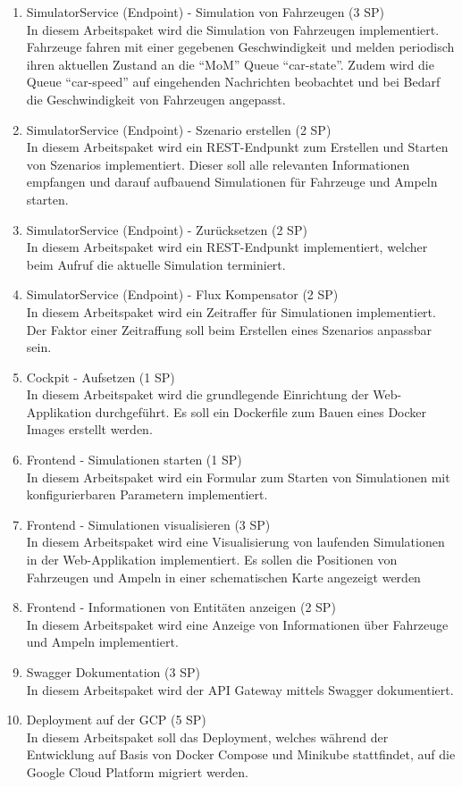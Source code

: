 \begin{enumerate}
  \item SimulatorService (Endpoint) - Simulation von Fahrzeugen (3 SP)\\
  		In diesem Arbeitspaket wird die Simulation von Fahrzeugen implementiert.
  		Fahrzeuge fahren mit einer gegebenen Geschwindigkeit und melden periodisch ihren aktuellen Zustand an die \enquote{MoM} Queue \enquote{car-state}.
  		Zudem wird die Queue \enquote{car-speed} auf eingehenden Nachrichten beobachtet und bei Bedarf die Geschwindigkeit von Fahrzeugen angepasst.
  \item SimulatorService (Endpoint) - Szenario erstellen (2 SP)\\
  		In diesem Arbeitspaket wird ein REST-Endpunkt zum Erstellen und Starten von Szenarios implementiert.
  		Dieser soll alle relevanten Informationen empfangen und darauf aufbauend Simulationen für Fahrzeuge und Ampeln starten.
  \item SimulatorService (Endpoint) - Zurücksetzen (2 SP)\\
  		In diesem Arbeitspaket wird ein REST-Endpunkt implementiert, welcher beim Aufruf die aktuelle Simulation terminiert.
  \item SimulatorService (Endpoint) - Flux Kompensator (2 SP)\\
  		In diesem Arbeitspaket wird ein Zeitraffer für Simulationen implementiert.
  		Der Faktor einer Zeitraffung soll beim Erstellen eines Szenarios anpassbar sein.
  \item Cockpit - Aufsetzen (1 SP)\\
  		In diesem Arbeitspaket wird die grundlegende Einrichtung der Web-Applikation durchgeführt.
  		Es soll ein Dockerfile zum Bauen eines Docker Images erstellt werden.
  \item Frontend - Simulationen starten (1 SP)\\
 		In diesem Arbeitspaket wird ein Formular zum Starten von Simulationen mit konfigurierbaren Parametern implementiert.
  \item Frontend - Simulationen visualisieren (3 SP)\\
		In diesem Arbeitspaket wird eine Visualisierung von laufenden Simulationen in der Web-Applikation implementiert.
		Es sollen die Positionen von Fahrzeugen und Ampeln in einer schematischen Karte angezeigt werden
  \item Frontend - Informationen von Entitäten anzeigen (2 SP)\\
  		In diesem Arbeitspaket wird eine Anzeige von Informationen über Fahrzeuge und Ampeln implementiert.
  \item Swagger Dokumentation (3 SP)\\
  		In diesem Arbeitspaket wird der API Gateway mittels Swagger dokumentiert.
  \item Deployment auf der GCP (5 SP)\\
  		In diesem Arbeitspaket soll das Deployment, welches während der Entwicklung auf Basis von Docker Compose und Minikube stattfindet, auf die Google Cloud Platform migriert werden.
\end{enumerate}
